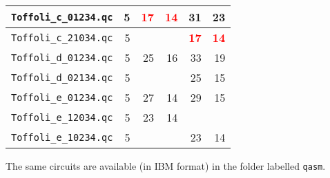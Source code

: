 \documentclass{article}
\newcommand\bred[1]{\textcolor{red}{\textbf{#1}}}
\begin{document}
\begin{longtabu}{|l|r|r|r|r|r|}
   {\tt Toffoli\_c\_01234.qc} & 5 & \bred{17} & \bred{14} & 31 & 23  \\  \hline
   {\tt Toffoli\_c\_21034.qc} & 5 &  &  & \bred{17} & \bred{14} \\  \hline
   {\tt Toffoli\_d\_01234.qc} & 5 & 25 & 16 & 33 & 19 \\  \hline
   {\tt Toffoli\_d\_02134.qc} & 5 &  &  & 25 & 15 \\  \hline
   {\tt Toffoli\_e\_01234.qc} & 5 & 27 & 14 & 29 &  15 \\  \hline
   {\tt Toffoli\_e\_12034.qc} & 5 & 23 & 14 & & \\  \hline
   {\tt Toffoli\_e\_10234.qc} & 5 &  &  & 23 &  14 \\  \hline
\end{longtabu} 
 
  
  \vspace{5mm}

The same circuits are available (in IBM format) in the folder labelled {\tt qasm}.

 
\end{document}
